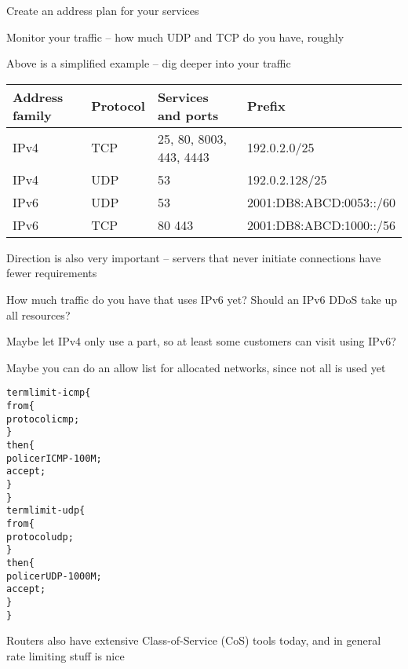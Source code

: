 \documentclass[Screen16to9,17pt]{foils}
\begin{document}
\begin{list2}
\item Create an address plan for your services
\item Monitor your traffic -- how much UDP and TCP do you have, roughly

\item Above is a simplified example -- dig deeper into your traffic
\end{list2}


\begin{tabularx}{\textwidth-5cm}{|p{2cm}|p{2cm}|p{7cm}|X|} \hline
{\bf Address family} & {\bf Protocol} & {\bf Services and ports} & {\bf Prefix}\\\hline
IPv4 & TCP & 25, 80, 8003, 443, 4443 & 192.0.2.0/25 \\\hline
IPv4 & UDP & 53 & 192.0.2.128/25 \\\hline
IPv6 & UDP & 53  & 2001:DB8:ABCD:0053::/60 \\\hline
IPv6 & TCP & 80 443 & 2001:DB8:ABCD:1000::/56 \\\hline
\end{tabularx}

\begin{list2}
\item Direction is also very important -- servers that never initiate connections have fewer requirements
\item How much traffic do you have that uses IPv6 yet? Should an IPv6 DDoS take up all resources?
\item Maybe let IPv4 only use a part, so at least some customers can visit using IPv6?
\item Maybe you can do an allow list for allocated networks, since not all is used yet
\end{list2}



\begin{alltt}\footnotesize
term limit-icmp \{
    from \{
        protocol icmp;
    \}
    then \{
        policer ICMP-100M;
        accept;
    \}
\}
term limit-udp \{
    from \{
        protocol udp;
    \}
    then \{
        policer UDP-1000M;
        accept;
    \}
\}
\end{alltt}

Routers also have extensive Class-of-Service (CoS) tools today, and in general rate limiting stuff is nice
\end{document}
